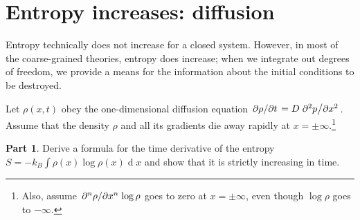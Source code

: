 \documentclass[11pt]{article}
\renewcommand{\d}[1]{\ensuremath{\operatorname{d}\!{#1}}}
\theoremstyle{definition}
\newtheorem{question}{Part}[section]
\numberwithin{equation}{section}
\numberwithin{figure}{section}
\begin{document}
\newpage
\section{Entropy increases: diffusion}

Entropy technically does not increase for a closed system. However, in most of the coarse-grained theories, entropy does increase; when we integrate out degrees of freedom, we provide a means for the information about the initial conditions to be destroyed.

Let $\rho(x,t)$ obey the one-dimensional diffusion equation $\pdv*{\rho}{t} = D\pdv*[2]{p}{x}$. Assume that the density $\rho$ and all its gradients die away rapidly at $x = \pm \infty$.\footnote{Also, assume $\pdv*[n]{\rho}{x} \log{\rho}$ goes to zero at $x = \pm \infty$, even though $\log{\rho}$ goes to $-\infty$.}

\begin{question}
Derive a formula for the time derivative of the entropy $S = -k_B \int \rho(x)\log{\rho(x)} \d{x}$ and show that it is strictly increasing in time.
\end{question}
\end{document}
